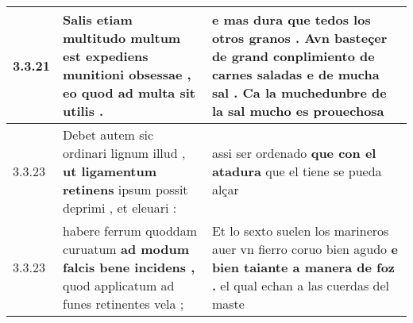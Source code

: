 \begin{tabular}{|p{1cm}|p{6.5cm}|p{6.5cm}|}
3.3.21 & Salis etiam multitudo multum est \textbf{ expediens munitioni obsessae , } eo quod ad multa sit utilis . & e mas dura que tedos los otros granos . \textbf{ Avn basteçer de grand conplimiento de carnes saladas e de mucha sal . } Ca la muchedunbre de la sal mucho es prouechosa \\\hline
3.3.23 & Debet autem sic ordinari lignum illud , \textbf{ ut ligamentum retinens } ipsum possit deprimi , et eleuari : & assi ser ordenado \textbf{ que con el atadura } que el tiene se pueda alçar \\\hline
3.3.23 & habere ferrum quoddam curuatum \textbf{ ad modum falcis bene incidens , } quod applicatum ad funes retinentes vela ; & Et lo sexto suelen los marineros auer vn fierro coruo bien agudo \textbf{ e bien taiante a manera de foz . } el qual echan a las cuerdas del maste \\\hline

\end{tabular}
